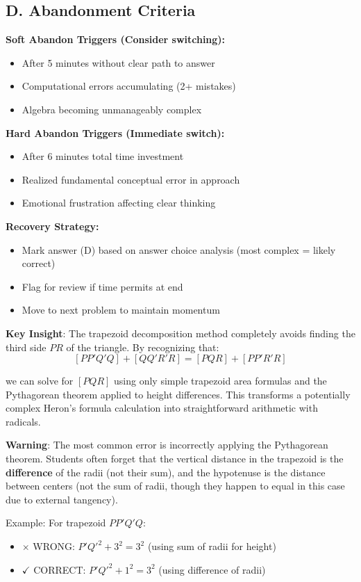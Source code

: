 \documentclass[]{article}
\begin{document}
\begin{competitionbox}
\subsection*{D. Abandonment Criteria}
\textbf{Soft Abandon Triggers (Consider switching):}
\begin{itemize}[leftmargin=*]
    \item After 5 minutes without clear path to answer
    \item Computational errors accumulating (2+ mistakes)
    \item Algebra becoming unmanageably complex
\end{itemize}

\textbf{Hard Abandon Triggers (Immediate switch):}
\begin{itemize}[leftmargin=*]
    \item After 6 minutes total time investment
    \item Realized fundamental conceptual error in approach
    \item Emotional frustration affecting clear thinking
\end{itemize}

\textbf{Recovery Strategy:}
\begin{itemize}[leftmargin=*]
    \item Mark answer (D) based on answer choice analysis (most complex = likely correct)
    \item Flag for review if time permits at end
    \item Move to next problem to maintain momentum
\end{itemize}
\end{competitionbox}

\begin{keyinsightbox}
\textbf{Key Insight}: The trapezoid decomposition method completely avoids finding the third side $PR$ of the triangle. By recognizing that:
\[[PP'Q'Q] + [QQ'R'R] = [PQR] + [PP'R'R]\]

we can solve for $[PQR]$ using only simple trapezoid area formulas and the Pythagorean theorem applied to height differences. This transforms a potentially complex Heron's formula calculation into straightforward arithmetic with radicals.
\end{keyinsightbox}

\begin{warningbox}
\textbf{Warning}: The most common error is incorrectly applying the Pythagorean theorem. Students often forget that the vertical distance in the trapezoid is the \textbf{difference} of the radii (not their sum), and the hypotenuse is the distance between centers (not the sum of radii, though they happen to equal in this case due to external tangency).

Example: For trapezoid $PP'Q'Q$:
\begin{itemize}
    \item $\times$ WRONG: $P'Q'^2 + 3^2 = 3^2$ (using sum of radii for height)
    \item $\checkmark$ CORRECT: $P'Q'^2 + 1^2 = 3^2$ (using difference of radii)
\end{itemize}
\end{warningbox}
\end{document}
